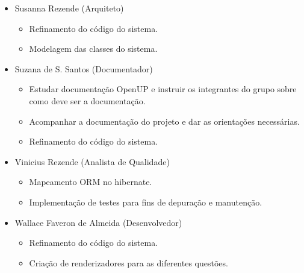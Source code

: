 \documentclass[12pt,letterpaper]{article}
\begin{document}
\begin{itemize}
\item {}Susanna Rezende (Arquiteto)\\
\vspace{-0.5cm}
\begin{itemize}
\item{}Refinamento do código do sistema.\\
\item{}Modelagem das classes do sistema.
\end{itemize}
\vspace{0.5cm}

\item {}Suzana de S. Santos (Documentador)\\
\vspace{-0.5cm}
\begin{itemize}
\item{}Estudar documentação OpenUP e instruir os integrantes do grupo sobre como deve ser a documentação.\\
\item{}Acompanhar a documentação do projeto e dar as orientações necessárias.\\
\item{}Refinamento do código do sistema.
\end{itemize}
\vspace{0.5cm}

\item {}Vinicius Rezende (Analista de Qualidade)\\
\vspace{-0.5cm}
\begin{itemize}
\item{}Mapeamento ORM no hibernate.\\
\item{}Implementação de testes para fins de depuração e manutenção.
\end{itemize}
\vspace{0.5cm}

\item {}Wallace Faveron de Almeida (Desenvolvedor)\\
\vspace{-0.5cm}
\begin{itemize}
\item{}Refinamento do código do sistema.\\
\item{}Criação de renderizadores para as diferentes questões.
\end{itemize}

\end{itemize}
\end{document}
